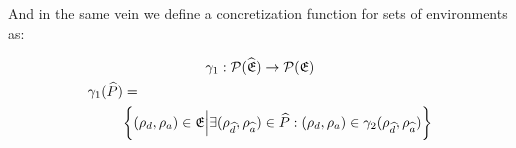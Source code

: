 And in the same vein we define a concretization function for sets of environments as:


\begin{gather}
    \gamma_1 : \mathcal{P}(\widehat{\mathfrak{E}}) \rightarrow \mathcal{P}(\mathfrak{E})\\
    \begin{split}
         \gamma_1(\widehat{P})& = \\
        & \biggl\{ (\rho_{d}, \rho_{a}) \in \mathfrak{E}
        \Big| \exists (\rho_{\widehat{d}}, \rho_{\widehat{a}}) \in \widehat{P} : (\rho_{d}, \rho_{a}) \in \gamma_2(\rho_{\widehat{d}}, \rho_{\widehat{a}})\biggr\}
    \end{split}
\end{gather}

